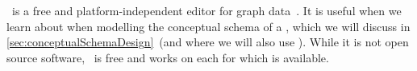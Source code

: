 %
%
\label{sec:installingYed}%
%
\yEd\ is a free and platform-independent editor for graph data~\cite{SG2015MDAWY,Y2011YGEM}.
It is useful when we learn about  when modelling the conceptual schema of a \db, which we will discuss in \cref{sec:conceptualSchemaDesign}~(and where we will also use \yEd).
While it is not open source software, \yEd\ is free and works on each  for which  is available.%
%
%
%
%
\endhsection%
%
